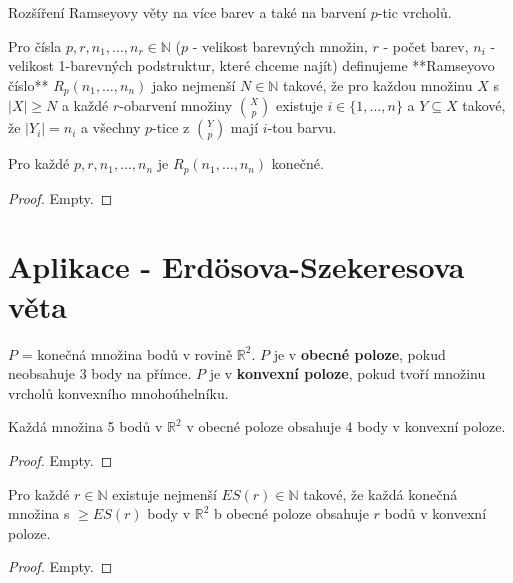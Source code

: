 Rozšíření Ramseyovy věty na více barev a také na barvení $p$-tic vrcholů.

\begin{definice}
	Pro čísla $p,r,n_{1}, \dots , n_{r} \in \mathbb{N}$ ($p$ - velikost barevných množin, $r$ - počet barev, $n_{i}$ - velikost 1-barevných podstruktur, které chceme najít) definujeme **Ramseyovo číslo** $R_{p}(n_{1}, \dots , n_{n})$ jako nejmenší $N \in \mathbb{N}$ takové, že pro každou množinu $X$ s $|X| \geq N$ a každé $r$-obarvení množiny $\binom{X}{p}$ existuje $i \in \{ 1, \dots , n \}$ a $Y \subseteq X$ takové, že $|Y_{i}| = n_{i}$ a všechny $p$-tice z $\binom{Y}{p}$ mají $i$-tou barvu.
\end{definice}

\begin{veta}
	Pro každé $p,r,n_{1}, \dots , n_{n}$ je $R_{p}(n_{1}, \dots , n_{n})$ konečné.
\end{veta}

\begin{proof}
	Empty.
\end{proof}

\section{Aplikace - Erdösova-Szekeresova věta}

\begin{definice}
	$P$ = konečná množina bodů v rovině $\mathbb{R}^{2}$. $P$ je v \textbf{obecné poloze}, pokud neobsahuje 3 body na přímce. $P$ je v \textbf{konvexní poloze}, pokud tvoří množinu vrcholů konvexního mnohoúhelníku.
\end{definice}

\begin{lemma}
	Každá množina 5 bodů v $\mathbb{R}^{2}$ v obecné poloze obsahuje 4 body v konvexní poloze.
\end{lemma}

\begin{proof}
	Empty.
\end{proof}

\begin{veta}
	Pro každé $r \in \mathbb{N}$ existuje nejmenší $ES(r) \in \mathbb{N}$ takové, že každá konečná množina s $\geq ES(r)$ body v $\mathbb{R}^{2}$ b obecné poloze obsahuje $r$ bodů v konvexní poloze.
\end{veta}

\begin{proof}
	Empty.
\end{proof}

